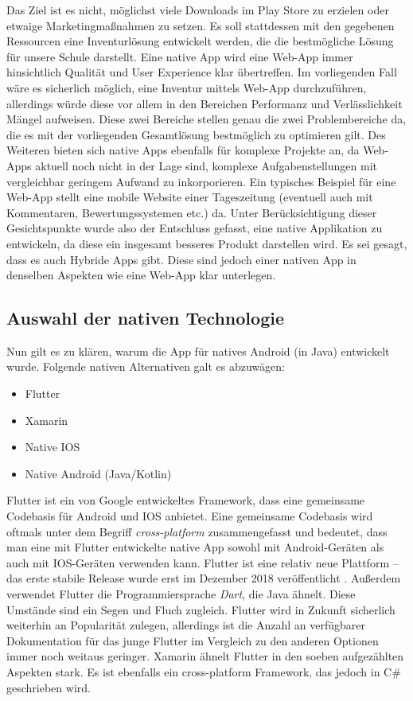 Das Ziel ist es nicht, möglichst viele Downloads im Play Store zu
erzielen oder etwaige Marketingmaßnahmen zu setzen. Es soll stattdessen
mit den gegebenen Ressourcen eine Inventurlösung entwickelt werden, die
die bestmögliche Lösung für unsere Schule darstellt. Eine native App
wird eine Web-App immer hinsichtlich Qualität und User Experience klar
übertreffen. Im vorliegenden Fall wäre es sicherlich möglich, eine
Inventur mittels Web-App durchzuführen, allerdings würde diese vor allem
in den Bereichen Performanz und Verlässlichkeit Mängel aufweisen. Diese
zwei Bereiche stellen genau die zwei Problembereiche da, die es mit der
vorliegenden Gesamtlösung bestmöglich zu optimieren gilt. Des Weiteren
bieten sich native Apps ebenfalls für komplexe Projekte an, da Web-Apps
aktuell noch nicht in der Lage sind, komplexe Aufgabenstellungen mit
vergleichbar geringem Aufwand zu inkorporieren. Ein typisches Beispiel
für eine Web-App stellt eine mobile Website einer Tageszeitung
(eventuell auch mit Kommentaren, Bewertungssystemen etc.) da. Unter
Berücksichtigung dieser Gesichtspunkte wurde also der Entschluss
gefasst, eine native Applikation zu entwickeln, da diese ein insgesamt
besseres Produkt darstellen wird. Es sei gesagt, dass es auch Hybride
Apps gibt. Diese sind jedoch einer nativen App in denselben Aspekten wie
eine Web-App klar unterlegen.

\hypertarget{auswahl-der-nativen-technologie}{%
\subsection{Auswahl der nativen
Technologie}\label{auswahl-der-nativen-technologie}}

Nun gilt es zu klären, warum die App für natives Android (in Java)
entwickelt wurde. Folgende nativen Alternativen galt es abzuwägen:

\begin{itemize}
\tightlist
\item
  Flutter \cite{flutter}
\item
  Xamarin \cite{xamarin}
\item
  Native IOS
\item
  Native Android (Java/Kotlin)
\end{itemize}

Flutter ist ein von Google entwickeltes Framework, dass eine gemeinsame
Codebasis für Android und IOS anbietet. Eine gemeinsame Codebasis wird
oftmals unter dem Begriff \emph{cross-platform} zusammengefasst und
bedeutet, dass man eine mit Flutter entwickelte native App sowohl mit
Android-Geräten als auch mit IOS-Geräten verwenden kann. Flutter ist
eine relativ neue Plattform -- das erste stabile Release wurde erst im
Dezember 2018 veröffentlicht \cite{flutter-stable}. Außerdem verwendet
Flutter die Programmiersprache \emph{Dart}, die Java ähnelt. Diese
Umstände sind ein Segen und Fluch zugleich. Flutter wird in Zukunft
sicherlich weiterhin an Popularität zulegen, allerdings ist die Anzahl
an verfügbarer Dokumentation für das junge Flutter im Vergleich zu den
anderen Optionen immer noch weitaus geringer. Xamarin ähnelt Flutter in
den soeben aufgezählten Aspekten stark. Es ist ebenfalls ein
cross-platform Framework, das jedoch in C\# geschrieben wird.

